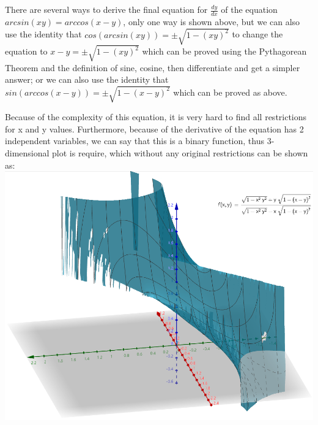 \documentclass[12pt, titlepage]{article}
\begin{document}
    There are several ways to derive the final equation for $\frac{dy}{dx}$ of the equation $arcsin(xy)=arccos(x-y)$, only one way is shown above, but we can also use the identity that $cos(arcsin(xy))=\pm\sqrt{1-(xy)^2}$ to change the equation to $x-y=\pm\sqrt{1-(xy)^2}$ which can be proved using the Pythagorean Theorem and the definition of sine, cosine, then differentiate and get a simpler answer; or we can also use the identity that $sin(arccos(x-y))=\pm\sqrt{1-(x-y)^2}$ which can be proved as above. 

    Because of the complexity of this equation, it is very hard to find all restrictions for x and y values. Furthermore, because of the derivative of the equation has 2 independent variables, we can say that this is a binary function, thus 3-dimensional plot is require, which without any original restrictions can be shown as:\\
    
    \includegraphics[scale=0.51]{1111}
\end{document}
